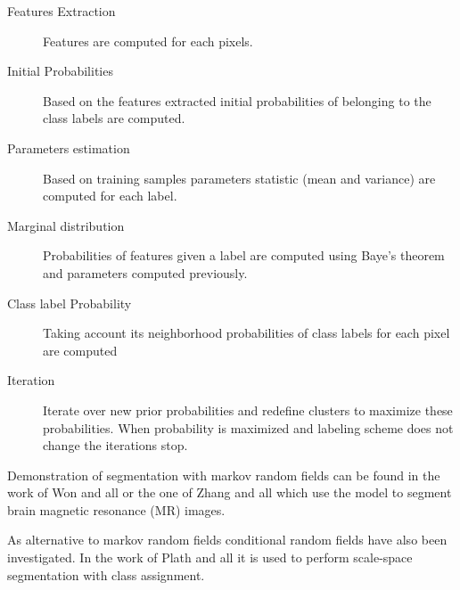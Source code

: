   \begin{description}
    \item[Features Extraction] Features are computed for each pixels.
    \item[Initial Probabilities] Based on the features extracted initial probabilities of belonging to the class labels are computed.
    \item[Parameters estimation] Based on training samples parameters statistic (mean and variance) are computed for each label.
    \item[Marginal distribution] Probabilities of features given a label are computed using Baye's theorem and parameters computed previously.
    \item[Class label Probability] Taking account its neighborhood probabilities of class labels for each pixel are computed
    \item[Iteration] Iterate over new prior probabilities and redefine clusters to maximize these probabilities. When probability is maximized and labeling scheme does not change the iterations stop.
  \end{description}

  Demonstration of segmentation with markov random fields can be found in the work of Won and all \cite{won1992unsupervised} or the one of Zhang and all \cite{zhang2001segmentation} which use the model to segment brain magnetic resonance (MR) images.

  As alternative to markov random fields conditional random fields have also been investigated. In the work of Plath and all \cite{plath2009multi} it is used to perform scale-space segmentation with class assignment.
